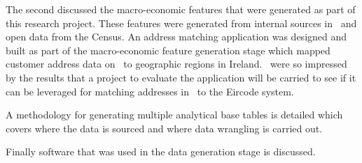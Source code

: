 The second discussed the macro-economic features that were generated as part of this research project. These features were generated from internal sources in \subjectname\ and open data from the Census. An address matching application was designed and built as part of the macro-economic feature generation stage which mapped customer address data on \subjectname\ to geographic regions in Ireland. \subjectname\ were so impressed by the results that a project to evaluate the application will be carried to see if it can be leveraged for matching addresses in \subjectname\ to the Eircode system.

A methodology for generating multiple analytical base tables is detailed which covers where the data is sourced and where data wrangling is carried out. 

Finally software that was used in the data generation stage is discussed.
